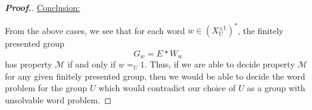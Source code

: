 \documentclass[11pt,a4paper,reqno]{amsart}
\theoremstyle{plain}
\theoremstyle{definition}
\theoremstyle{definition}
\newenvironment{myproof}{\begin{proof}[\normalfont\bfseries Proof.]}{\end{proof}}
\begin{document}
\begin{myproof}
	\medskip

	\noindent
	\underline{Conclusion:}

	\smallskip
	\noindent
	From the above cases, we see that for each word $w \in (X_U^{\pm 1})^*$, the finitely presented group
	\[
		G_w = E * W_w
	\]
	has property $\mathcal M$ if and only if $w =_U 1$.
	Thus, if we are able to decide property $\mathcal M$ for any given finitely presented group, then we would be able to decide the word problem for the group $U$ which would contradict our choice of $U$ as a group with unsolvable word problem.
\end{myproof}

\printbibliography
\end{document}
